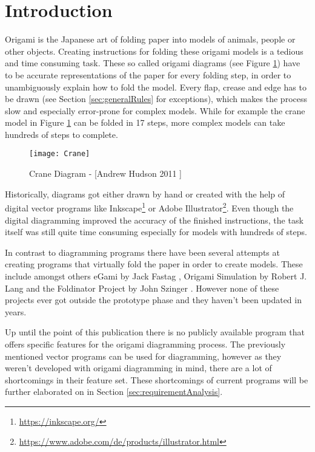 
\section{Introduction}
\label{sec:introduction}

Origami is the Japanese art of folding paper into models of animals, people or other objects. Creating instructions for folding these \gls{origami} models is a tedious and time consuming task. These so called origami diagrams (see Figure \ref{fig:craneDiagram}) have to be accurate representations of the paper for every folding step, in order to unambiguously explain how to fold the model. Every flap, crease and edge has to be drawn (see Section \ref{sec:generalRules} for exceptions), which makes the process slow and especially error-prone for complex models. While for example the crane model in Figure \ref{fig:craneDiagram} can be folded in 17 steps, more complex models can take hundreds of steps to complete.
\begin{figure}[htbp]
	\centering
	\texttt{[image: Crane]}
	\caption[Crane Diagram]{Crane Diagram - [Andrew Hudson 2011 \cite{Hudson}]}
	\label{fig:craneDiagram}
\end{figure}

\noindent Historically, diagrams got either drawn by hand or created with the help of digital vector programs like Inkscape\footnote{\url{https://inkscape.org/}} or Adobe Illustrator\footnote{\url{https://www.adobe.com/de/products/illustrator.html}}. Even though the digital diagramming improved the accuracy of the finished instructions, the task itself was still quite time consuming especially for models with hundreds of steps.

In contrast to diagramming programs there have been several attempts at creating programs that virtually fold the paper in order to create models. These include amongst others eGami by Jack Fastag \cite{eGami}, Origami Simulation by Robert J. Lang \cite{origamiSimulation} and the Foldinator Project by John Szinger \cite{foldinator}. However none of these projects ever got outside the prototype phase and they haven't been updated in years.

Up until the point of this publication there is no publicly available program that offers specific features for the origami diagramming process.  The previously mentioned vector programs can be used for diagramming, however as they weren't developed with origami diagramming in mind, there are a lot of shortcomings in their feature set. These shortcomings of current programs will be further elaborated on in Section \ref{sec:requirementAnalysis}.

